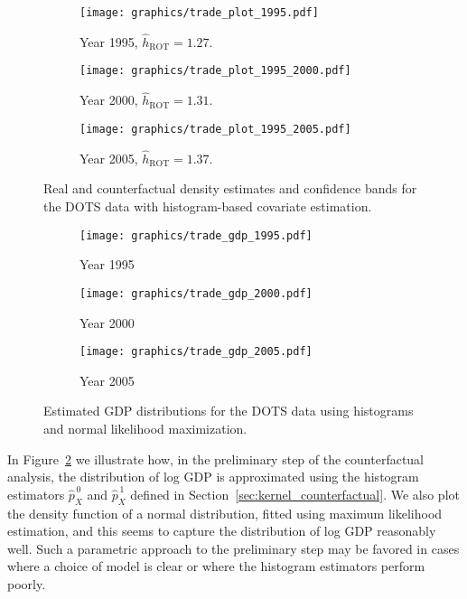 \documentclass[11pt,lof]{puthesis}
\DeclareMathOperator{\ROT}{ROT}
\theoremstyle{break}
\theoremstyle{proof}
\begin{document}
\begin{figure}[t]
  \centering
  \begin{subfigure}{0.32\textwidth}
    \centering
    \texttt{[image: graphics/trade\_plot\_1995.pdf]}
    \caption{Year 1995, $\hat h_{\ROT} = 1.27$.}
  \end{subfigure}
  \begin{subfigure}{0.32\textwidth}
    \centering
    \texttt{[image: graphics/trade\_plot\_1995\_2000.pdf]}
    \caption{Year 2000, $\hat h_{\ROT} = 1.31$.}
  \end{subfigure}
  \begin{subfigure}{0.32\textwidth}
    \centering
    \texttt{[image: graphics/trade\_plot\_1995\_2005.pdf]}
    \caption{Year 2005, $\hat h_{\ROT} = 1.37$.}
  \end{subfigure}
  \caption[Histogram-based estimation and inference for the DOTS data]{
    Real and counterfactual density estimates and confidence bands for
  the DOTS data with histogram-based covariate estimation.}
  \label{fig:kernel_trade}
\end{figure}

\begin{figure}[b!]
  \centering
  \begin{subfigure}{0.32\textwidth}
    \centering
    \texttt{[image: graphics/trade\_gdp\_1995.pdf]}
    \caption{Year 1995}
  \end{subfigure}
  \begin{subfigure}{0.32\textwidth}
    \centering
    \texttt{[image: graphics/trade\_gdp\_2000.pdf]}
    \caption{Year 2000}
  \end{subfigure}
  \begin{subfigure}{0.32\textwidth}
    \centering
    \texttt{[image: graphics/trade\_gdp\_2005.pdf]}
    \caption{Year 2005}
  \end{subfigure}
  \caption[Estimated GDP distributions for the DOTS data]{
    Estimated GDP distributions for the DOTS data using histograms and
  normal likelihood maximization.}
  \label{fig:kernel_gdp}
\end{figure}

In Figure~\ref{fig:kernel_gdp} we illustrate how, in the preliminary step of the
counterfactual analysis, the distribution of log GDP is approximated using the
histogram estimators $\hat p_X^{\,0}$ and $\hat p_X^{\,1}$ defined in
Section~\ref{sec:kernel_counterfactual}. We also plot the density function of a
normal distribution, fitted using maximum likelihood estimation, and this seems
to capture the distribution of log GDP reasonably well. Such a parametric
approach to the preliminary step may be favored in cases where a choice of
model is clear or where the histogram estimators perform poorly.
\end{document}
